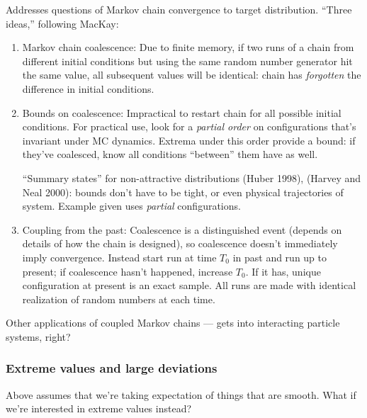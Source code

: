\documentclass[notitlepage,openany,11pt]{report}
\theoremstyle{plain}%
\numberwithin{equation}{section}
\begin{document}
Addresses questions of Markov chain convergence to target distribution. ``Three ideas,'' following MacKay:
\begin{enumerate}
\item Markov chain coalescence: Due to finite memory, if two runs of a chain from different initial conditions but using the same random number generator  hit the same value, all subsequent values will be identical: chain has \textit{forgotten} the difference in initial conditions.

\item Bounds on coalescence: Impractical to restart chain for all possible initial conditions. For practical use, look for a \textit{partial order} on configurations that's invariant under MC dynamics. Extrema under this order provide a bound: if they've coalesced, know all conditions ``between'' them have as well. 

``Summary states'' for non-attractive distributions (Huber 1998), (Harvey and Neal 2000): bounds don't have to be tight, or even physical trajectories of system. Example given uses \textit{partial} configurations. 

\item Coupling from the past: Coalescence is a distinguished event (depends on details of how the chain is designed), so coalescence doesn't immediately imply convergence. Instead start run at time $T_{0}$ in past and run up to present;  if coalescence hasn't happened, increase $T_{0}$. If it has, unique configuration at present is an exact sample. All runs are made with identical realization of random numbers at each time. 

\end{enumerate}

Other applications of coupled Markov chains --- gets into interacting particle systems, right?


\subsubsection{Extreme values and large deviations} Above assumes that we're taking expectation of things that are smooth. What if we're interested in extreme values instead?
\end{document}
